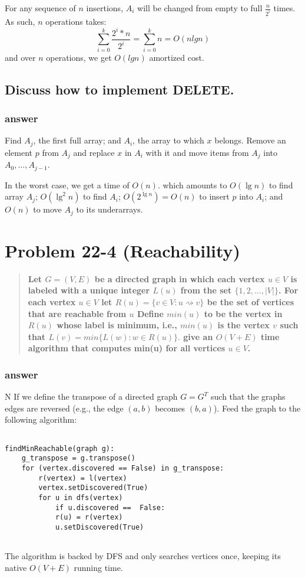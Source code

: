 \documentclass[titlepage]{article}\usepackage[]{graphicx}\usepackage[]{color}
\begin{document}
  For any sequence of $n$ insertions, $A_i$ will be changed from empty to
  full $\frac{n}{2^i}$ times. As such, $n$ operations takes:
  \[ \sum_{i=0}^{k} \frac{2^i *n }{2^i} = \sum_{i=0}^{k} n = O(n lg n)\] 
  and over $n$ operations, we get $O(lg n)$ amortized cost.


\subsection{Discuss how to implement DELETE.}
  \subsubsection{answer}
  Find $A_j$, the first full array; and
  $A_i$, the array to which $x$ belongs. Remove an element $p$ from
  $A_j$ and replace $x$ in $A_i$ with it and move  
  items from $A_j$ into $A_0, \dots, A_{j-1}$.

  In the worst case, we get a time of $O(n)$.
  which amounts to $O(\lg n)$ to find array $A_j$; $O(\lg^2 n)$ to 
  find $A_i$; $O(2^{\lg n}) = O(n)$ to insert $p$
  into $A_i$; and $O(n)$ to move
  $A_j$ to its underarrays. 

\section{Problem 22-4 (Reachability)}
\begin{quote}
\textbf{Let $G = (V,E) $ be a directed graph in which each vertex $ u \in V$
  is labeled with a unique integer $L(u) $ from the set $\{1,2,\dots,|V|\}$.
  For each vertex $u \in V$ let $R(u) = \{v \in V : u \rightsquigarrow v\}$ be
  the set of vertices that are reachable from $u$ Define $min(u)$ to be the
  vertex in $R(u)$ whose label is minimum, i.e., $min(u)$ is the vertex $v$
  such that $L(v) = min\{L(w) : w \in R(u)\}. $ give an $O(V + E)$ time
  algorithm that computes min(u) for all vertices $u \in V$.  }
\end{quote}
\subsubsection{answer}
N
If we define the transpose of a directed graph $G = G^T$ such that the graphs
edges are reversed (e.g., the edge $(a,b)$ becomes $(b,a)$). Feed the graph to
the following algorithm:
\begin{lstlisting}

findMinReachable(graph g):
	g_transpose = g.transpose()
	for (vertex.discovered == False) in g_transpose:
		r(vertex) = l(vertex)
		vertex.setDiscovered(True)
		for u in dfs(vertex)
			if u.discovered ==  False:
			r(u) = r(vertex)
			u.setDiscovered(True)
	  
\end{lstlisting}
The algorithm is backed by DFS and only searches vertices once, keeping its
native $O(V + E) $ running time. 
\end{document}
